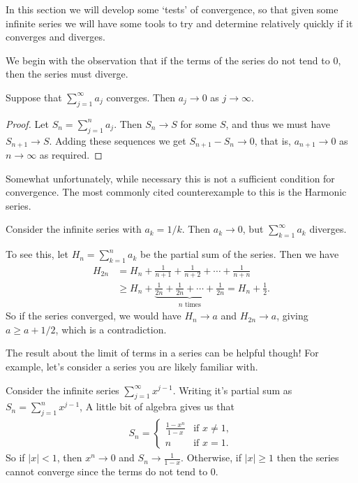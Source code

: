 In this section we will develop some `tests' of convergence, so that given some infinite series we will have some tools to try and determine relatively quickly if it converges and diverges.

We begin with the observation that if the terms of the series do not tend to 0, then the series must diverge.

\begin{proposition}\label{prop:limit-of-terms}
	Suppose that $\sum_{j = 1}^{\infty} a_j$ converges. Then $a_j \rightarrow 0$ as $j \rightarrow \infty$.
\end{proposition}
\begin{proof}
	Let $S_n = \sum_{j = 1}^{n} a_j$. Then $S_n \rightarrow S$ for some $S$, and thus we must have $S_{n + 1} \rightarrow S$. Adding these sequences we get $S_{n+1} - S_{n} \rightarrow 0$, that is, $a_{n + 1} \rightarrow 0$ as $n \rightarrow \infty$ as required.
\end{proof}

Somewhat unfortunately, while necessary this is not a sufficient condition for convergence. The most commonly cited counterexample to this is the Harmonic series.

\begin{example}
	Consider the infinite series with $a_k = 1/k$. Then $a_k \rightarrow 0$, but $\sum_{k = 1}^\infty a_k$ diverges.

	To see this, let $H_n = \sum_{k = 1}^n a_k$ be the partial sum of the series. Then we have
	\begin{align*}
		H_{2n} &= H_n + \frac{1}{n + 1} + \frac{1}{n + 2} + \cdots + \frac{1}{n + n} \\
		&\geq  H_n + \underbrace{\frac{1}{2n} + \frac{1}{2n} + \cdots + \frac{1}{2n}}_{\text{$n$ times}} = H_n + \frac{1}{2}.
	\end{align*}
	So if the series converged, we would have $H_n \rightarrow a$ and $H_{2n} \rightarrow a$, giving $a \geq a + 1/2$, which is a contradiction.
\end{example}

The result about the limit of terms in a series can be helpful though! For example, let's consider a series you are likely familiar with.

\begin{example}
		Consider the infinite series $\sum_{j = 1}^{\infty} x^{j - 1}$. Writing it's partial sum as
	$S_n = \sum_{j = 1}^{n} x^{j-1}$,
	A little bit of algebra gives us that
	\begin{align*}
		S_n = \begin{cases}
        \frac{1 - x^n}{1 - x} &\mbox{if } x \neq 1, \\
        n &\mbox{if } x = 1.
       \end{cases}
	\end{align*}
	So if $|x| < 1$, then $x^n \rightarrow 0$ and $S_n \rightarrow \frac{1}{1 - x}$. Otherwise, if $|x| \geq 1$ then the series cannot converge since the terms do not tend to 0.
\end{example}

